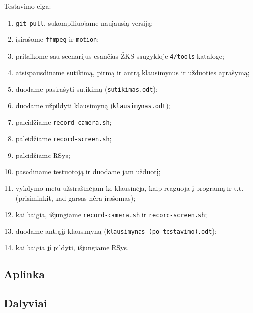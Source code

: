 Testavimo eiga:
\begin{enumerate}
  \item \verb|git pull|, sukompiliuojame naujausią versiją;
  \item įsirašome \verb|ffmpeg| ir \verb|motion|;
  \item pritaikome sau scenarijus esančius ŽKS saugykloje
    \verb|4/tools| kataloge;
  \item atsispausdiname sutikimą, pirmą ir antrą klausimynus ir užduoties
    aprašymą;
  \item duodame pasirašyti sutikimą (\verb|sutikimas.odt|);
  \item duodame užpildyti klausimyną (\verb|klausimynas.odt|);
  \item paleidžiame \verb|record-camera.sh|;
  \item paleidžiame \verb|record-screen.sh|;
  \item paleidžiame RSys;
  \item pasodiname testuotoją ir duodame jam užduotį;
  \item vykdymo metu užsirašinėjam ko klausinėja, kaip reaguoja į programą
    ir t.t. (prisiminkit, kad garsas nėra įrašomas);
  \item kai baigia, išjungiame \verb|record-camera.sh| ir
    \verb|record-screen.sh|;
  \item duodame antrąjį klausimyną (\verb|klausimynas (po testavimo).odt|);
  \item kai baigia jį pildyti, išjungiame RSys.
\end{enumerate}

\subsection{Aplinka}

\subsection{Dalyviai}
